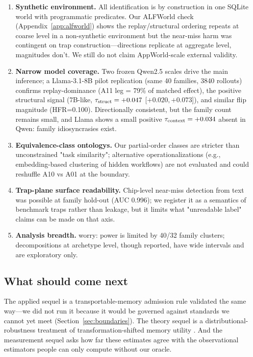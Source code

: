 \begin{enumerate}[leftmargin=1.8em]
  \item \textbf{Synthetic environment.} All identification is by construction in one SQLite world with programmatic predicates. Our ALFWorld check (Appendix~\ref{app:alfworld}) shows the replay/structural ordering repeats at coarse level in a non-synthetic environment but the near-miss harm was contingent on trap construction---directions replicate at aggregate level, magnitudes don't. We still do not claim AppWorld-scale external validity.
  \item \textbf{Narrow model coverage.} Two frozen Qwen2.5 scales drive the main inference; a Llama-3.1-8B pilot replication (same 40 families, 3840 rollouts) confirms replay-dominance (A11 leg = 79\% of matched effect), the positive structural signal (7B-like, $\tau_{\mathrm{struct}}=+0.047$ [$+0.020,+0.073$]), and similar flip magnitude (HFR=0.100). Directionally consistent, but the family count remains small, and Llama shows a small positive $\tau_{\mathrm{context}}=+0.034$ absent in Qwen: family idiosyncrasies exist.
  \item \textbf{Equivalence-class ontologys.} Our partial-order classes are stricter than unconstrained "task similarity"; alternative operationalizations (e.g., embedding-based clustering of hidden workflows) are not evaluated and could reshuffle A10 vs A01 at the boundary.
  \item \textbf{Trap-plane surface readability.} Chip-level near-miss detection from text was possible at family hold-out (AUC 0.996); we register it as a semantics of benchmark traps rather than leakage, but it limits what "unreadable label" claims can be made on that axis.
  \item \textbf{Analysis breadth.} worry: power is limited by 40/32 family clusters; decompositions at archetype level, though reported, have wide intervals and are exploratory only.
\end{enumerate}

\subsection{What should come next}

The applied sequel is a transportable-memory admission rule validated the same way---we did not run it because it would be governed against standards we cannot yet meet (Section~\ref{sec:boundaries}). The theory sequel is a distributional-robustness treatment of transformation-shifted memory utility \citep{angelopoulos2024crc,wu2016conservative,jalaldoust2024transport}. And the measurement sequel asks how far these estimates agree with the observational estimators people can only compute without our oracle.
